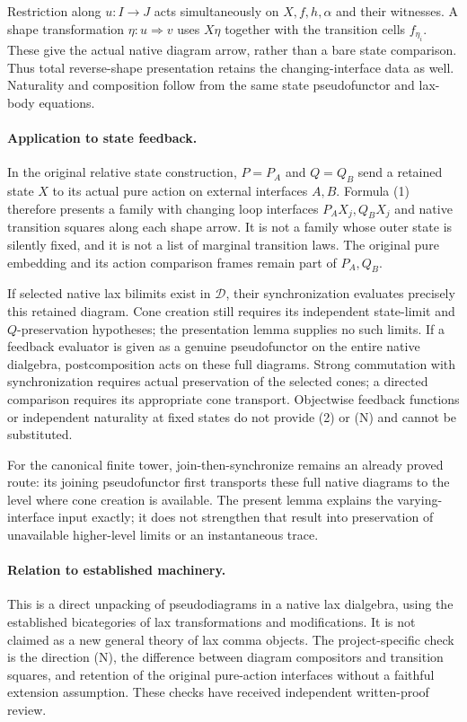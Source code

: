 \documentclass{article}
\begin{document}
Restriction along $u:I\to J$ acts simultaneously on $X,f,h,\alpha$ and their witnesses. A shape transformation $\eta:u\Rightarrow v$ uses $X\eta$ together with the transition cells $f_{\eta_i}$. These give the actual native diagram arrow, rather than a bare state comparison. Thus total reverse-shape presentation retains the changing-interface data as well. Naturality and composition follow from the same state pseudofunctor and lax-body equations.

\paragraph{Application to state feedback.} In the original relative state construction, $P=P_A$ and $Q=Q_B$ send a retained state $X$ to its actual pure action on external interfaces $A,B$. Formula (1) therefore presents a family with changing loop interfaces $P_AX_j,Q_BX_j$ and native transition squares along each shape arrow. It is not a family whose outer state is silently fixed, and it is not a list of marginal transition laws. The original pure embedding and its action comparison frames remain part of $P_A,Q_B$.

If selected native lax bilimits exist in $\mathcal D$, their synchronization evaluates precisely this retained diagram. Cone creation still requires its independent state-limit and $Q$-preservation hypotheses; the presentation lemma supplies no such limits. If a feedback evaluator is given as a genuine pseudofunctor on the entire native dialgebra, postcomposition acts on these full diagrams. Strong commutation with synchronization requires actual preservation of the selected cones; a directed comparison requires its appropriate cone transport. Objectwise feedback functions or independent naturality at fixed states do not provide (2) or (N) and cannot be substituted.

For the canonical finite tower, join-then-synchronize remains an already proved route: its joining pseudofunctor first transports these full native diagrams to the level where cone creation is available. The present lemma explains the varying-interface input exactly; it does not strengthen that result into preservation of unavailable higher-level limits or an instantaneous trace.

\paragraph{Relation to established machinery.} This is a direct unpacking of pseudodiagrams in a native lax dialgebra, using the established bicategories of lax transformations and modifications. It is not claimed as a new general theory of lax comma objects. The project-specific check is the direction (N), the difference between diagram compositors and transition squares, and retention of the original pure-action interfaces without a faithful extension assumption. These checks have received independent written-proof review.
\end{document}
